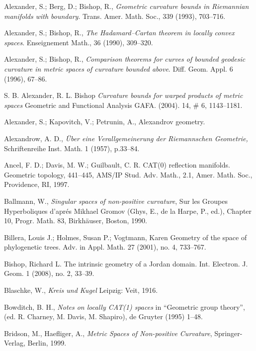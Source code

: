 \begin{thebibliography}{52}

 Alexander, S.; Berg, D.; Bishop, R., \textit{Geometric curvature bounds in Riemannian manifolds with
boundary}. Trans. Amer. Math. Soc., 339 (1993), 703--716.

Alexander, S.; Bishop, R., \textit{The Hadamard--Cartan theorem in locally convex spaces}. Enseignement Math., 36 (1990), 309--320.

 Alexander, S.; Bishop, R., 
\textit{Comparison theorems for curves of bounded geodesic curvature in metric spaces of curvature bounded above}.
Diff. Geom. Appl. 6 (1996), 67--86.

S. B. Alexander, R. L. Bishop 
\textit{Curvature bounds for warped products of metric spaces}
Geometric and Functional Analysis GAFA. (2004). 14, \# 6, 1143--1181.

Alexander, S.;
Kapovitch, V.;
Petrunin, A.,
Alexandrov geometry.

 Alexandrow, A. D.,  \textit{\"Uber eine Verallgemeinerung der Riemannschen Geometrie,}
Schriftenreihe Inst. Math. 1 (1957), p.33--84.

 Ancel, F. D.; Davis, M. W.; Guilbault, C. R.
CAT(0) reflection manifolds. Geometric topology, 441--445,
AMS/IP Stud. Adv. Math., 2.1, Amer. Math. Soc., Providence, RI, 1997.

Ballmann, W., \textit{Singular spaces of non-positive curvature}, Sur les Groupes Hyperboliques d'apr\'{e}s Mikhael Gromov (Ghys, E., de la Harpe, P., ed.), Chapter 10, Progr. Math. 83, Birkh\"auser, Boston, 1990. 

 Billera, Louis J.; Holmes, Susan P.; Vogtmann, Karen Geometry of the space of phylogenetic trees. Adv. in Appl. Math. 27 (2001), no. 4, 733--767.

Bishop, Richard L. The intrinsic geometry of a Jordan domain. Int. Electron. J. Geom. 1 (2008), no. 2, 33--39.

 Blaschke, W., \textit{Kreis und Kugel} Leipzig: Veit, 1916.

 Bowditch, B. H.,
\textit{Notes on locally CAT(1) spaces} 
in ``Geometric group theory'', (ed. R. Charney, M. Davis, M. Shapiro), de Gruyter (1995) 1--48.

Bridson, M., Haefliger, A.,
\textit{Metric Spaces of Non-positive Curvature},
Springer-Verlag, Berlin, 1999.


\end{thebibliography}
